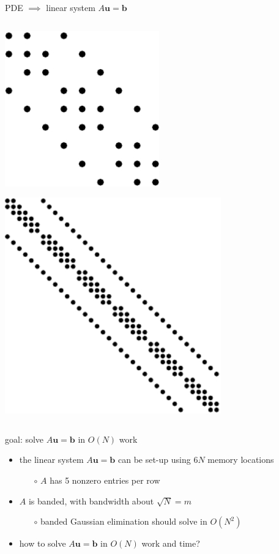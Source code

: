 \documentclass[10pt,
               svgnames,
               hyperref={colorlinks,citecolor=DeepPink4,linkcolor=FireBrick,urlcolor=Maroon},
               usepdftitle=false]{beamer}
\newcommand{\bb}{\mathbf{b}}
\newcommand{\bu}{\mathbf{u}}
\begin{document}
\begin{frame}{PDE $\implies$ linear system $A\bu=\bb$}
\begin{columns}
\begin{column}{0.27\textwidth}
\bigskip\medskip
\hfill \includegraphics[width=0.5\textwidth]{images/lapspy5.pdf}

\bigskip
\hfill \includegraphics[width=0.7\textwidth]{images/lapspy8.pdf}

\end{column}
\end{columns}
\end{frame}


\begin{frame}{goal: solve $A\bu=\bb$ in $O(N)$ work}
\begin{itemize}
\item the linear system $A\bu=\bb$ can be set-up using  $6N$ memory locations
	\begin{itemize}
	\item[$\circ$] $A$ has 5 nonzero entries per row
	\end{itemize}
\item $A$ is banded, with bandwidth about $\sqrt{N}=m$
	\begin{itemize}
	\item[$\circ$] banded Gaussian elimination should solve in $O(N^2)$
	\end{itemize}
\item how to solve $A\bu=\bb$ in $O(N)$ work and time?
\end{itemize}
\end{frame}
\end{document}
